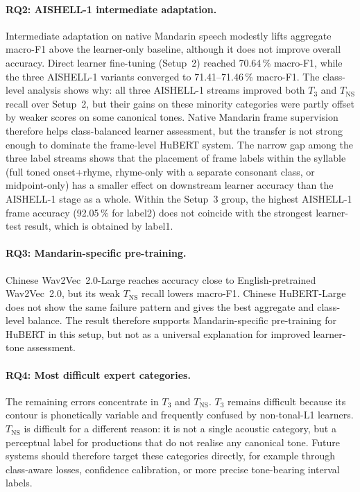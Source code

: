 \paragraph{RQ2: AISHELL-1 intermediate adaptation.}
Intermediate adaptation on native Mandarin speech modestly lifts aggregate
macro-F1 above the learner-only baseline, although it does not improve overall
accuracy. Direct learner fine-tuning (Setup~2) reached 70.64\,\% macro-F1,
while the three AISHELL-1 variants converged to 71.41--71.46\,\% macro-F1.
The class-level analysis shows why: all three AISHELL-1 streams improved both
\(T_3\) and \(T_{\mathrm{NS}}\) recall over Setup~2, but their gains on these
minority categories were partly offset by weaker scores on some canonical
tones. Native Mandarin frame supervision therefore helps class-balanced learner
assessment, but the transfer is not strong enough to dominate the frame-level
HuBERT system. The
narrow gap among the three label streams shows that the placement of frame
labels within the syllable (full toned onset+rhyme, rhyme-only with a
separate consonant class, or midpoint-only) has a smaller effect on
downstream learner accuracy than the AISHELL-1 stage as a whole. Within the
Setup~3 group, the highest AISHELL-1 frame accuracy (92.05\,\% for label2)
does not coincide with the strongest learner-test result, which is obtained by
label1.

\paragraph{RQ3: Mandarin-specific pre-training.}
Chinese Wav2Vec~2.0-Large reaches accuracy close to English-pretrained
Wav2Vec~2.0, but its weak \(T_{\mathrm{NS}}\) recall lowers macro-F1. Chinese
HuBERT-Large does not show the same failure pattern and gives the best
aggregate and class-level balance. The result therefore supports
Mandarin-specific pre-training for HuBERT in this setup, but not as a
universal explanation for improved learner-tone assessment.

\paragraph{RQ4: Most difficult expert categories.}
The remaining errors concentrate in \(T_3\) and \(T_{\mathrm{NS}}\). \(T_3\)
remains difficult because its contour is phonetically variable and frequently
confused by non-tonal-L1 learners. \(T_{\mathrm{NS}}\) is difficult for a
different reason: it is not a single acoustic category, but a perceptual label
for productions that do not realise any canonical tone. Future systems should
therefore target these categories directly, for example through class-aware
losses, confidence calibration, or more precise tone-bearing interval labels.

